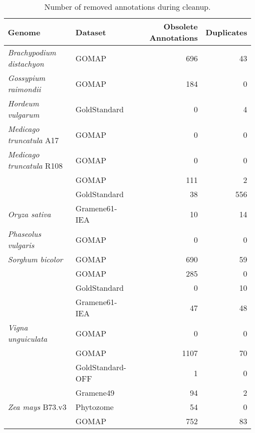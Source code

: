 \documentclass[utf8]{frontiersSCNS}
\begin{document}
\begin{table}[t]

\caption{\label{tab:cleanup-table}Number of removed annotations during cleanup.}
\centering
\begin{threeparttable}
\begin{tabular}{llrr}
\toprule
Genome & Dataset & Obsolete Annotations & Duplicates\\
\midrule
\rowcolor{gray!6}  \textit{Brachypodium distachyon} & GOMAP & 696 & 43\\
\cmidrule{1-4}
\textit{Gossypium raimondii} & GOMAP & 184 & 0\\
\cmidrule{1-4}
\rowcolor{gray!6}  \textit{Hordeum vulgarum} & GoldStandard & 0 & 4\\
\cmidrule{1-4}
\textit{Medicago truncatula} A17 & GOMAP & 0 & 0\\
\cmidrule{1-4}
\rowcolor{gray!6}  \textit{Medicago truncatula} R108 & GOMAP & 0 & 0\\
\cmidrule{1-4}
 & GOMAP & 111 & 2\\

\rowcolor{gray!6}   & GoldStandard & 38 & 556\\

\multirow{-3}{*}{\raggedright\arraybackslash \textit{Oryza sativa}} & Gramene61-IEA & 10 & 14\\
\cmidrule{1-4}
\rowcolor{gray!6}  \textit{Phaseolus vulgaris} & GOMAP & 0 & 0\\
\cmidrule{1-4}
\textit{Sorghum bicolor} & GOMAP & 690 & 59\\
\cmidrule{1-4}
\rowcolor{gray!6}   & GOMAP & 285 & 0\\

 & GoldStandard & 0 & 10\\

\rowcolor{gray!6}  \multirow{-3}{*}{\raggedright\arraybackslash \textit{Triticum aestivum}} & Gramene61-IEA & 47 & 48\\
\cmidrule{1-4}
\textit{Vigna unguiculata} & GOMAP & 0 & 0\\
\cmidrule{1-4}
\rowcolor{gray!6}   & GOMAP & 1107 & 70\\

 & GoldStandard-OFF & 1 & 0\\

\rowcolor{gray!6}   & Gramene49 & 94 & 2\\

\multirow{-4}{*}{\raggedright\arraybackslash \textit{Zea mays} B73.v3} & Phytozome & 54 & 0\\
\cmidrule{1-4}
\rowcolor{gray!6}   & GOMAP & 752 & 83\\


\end{tabular}
\end{threeparttable}
\end{table}
\end{document}
